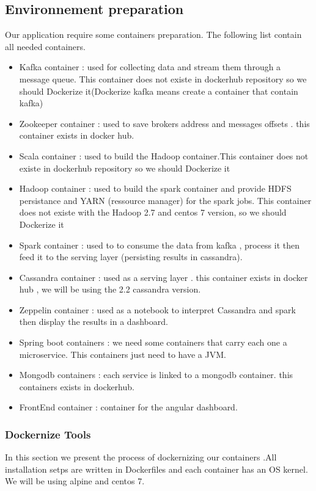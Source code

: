 \subsection{Environnement preparation}
\label{sec:sec01}
Our application require some containers preparation. The following list contain all needed containers.
\begin{itemize}
  \item Kafka container : used for collecting data and stream them through a message queue. This container does not existe in dockerhub repository so we should Dockerize it(Dockerize
   kafka means create a container that contain kafka)
  \item Zookeeper container : used to save brokers address and messages offsets . this container exists in docker hub.
  \item Scala container : used to build the Hadoop container.This container does not existe in dockerhub repository so we should Dockerize it
  \item Hadoop container : used to build the spark container and provide HDFS persistance and YARN (ressource manager) for the spark jobs. This container does not existe with
   the Hadoop 2.7 and centos 7 version, so we should Dockerize it
  \item Spark container : used to to consume the data from kafka , process it then feed it to the serving layer (persisting results in cassandra).
  \item Cassandra container : used as a serving layer . this container exists in docker hub , we will be using the 2.2 cassandra version.
  \item Zeppelin container : used as a notebook to interpret Cassandra and spark then display the results in a dashboard.
  \item Spring boot containers : we need some containers that carry each one a microservice. This containers just need to have a JVM.
  \item Mongodb containers : each service is linked to a mongodb container. this containers exists in dockerhub.
  \item FrontEnd container : container for the angular dashboard.
\end{itemize}
\subsubsection{Dockernize Tools}
\label{sec:sec01}
In this section we present the process of dockernizing our containers .All installation setps are written 
in Dockerfiles and each container has an OS kernel. We will be using alpine and centos 7.
